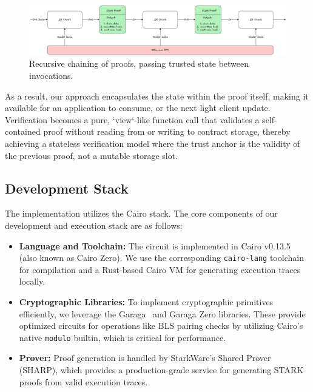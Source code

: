 \documentclass[runningheads]{llncs}
\begin{document}
\begin{figure}[H]
    \centering
    \includegraphics[width=1\textwidth]{diagrams/recursion_diagram.png}
    \caption{Recursive chaining of proofs, passing trusted state between invocations.}
    \label{fig:recursion_diagram}
\end{figure}

As a result, our approach encapsulates the state within the proof itself, making it available for an application to consume, or the next light client update. Verification becomes a pure, `view`-like function call that validates a self-contained proof without reading from or writing to contract storage, thereby achieving a stateless verification model where the trust anchor is the validity of the previous proof, not a mutable storage slot.

\subsection{Development Stack}
\label{subsection:development-stack}
The implementation utilizes the Cairo stack. The core components of our development and execution stack are as follows:

\begin{itemize}
    \item \textbf{Language and Toolchain:} The circuit is implemented in Cairo v0.13.5 (also known as Cairo Zero). We use the corresponding \texttt{cairo-lang} toolchain for compilation and a Rust-based Cairo VM for generating execution traces locally.
    \item \textbf{Cryptographic Libraries:} To implement cryptographic primitives efficiently, we leverage the Garaga~\cite{Prime2025Garaga} and Garaga Zero libraries. These provide optimized circuits for operations like BLS pairing checks by utilizing Cairo's native \texttt{modulo} builtin, which is critical for performance.
    \item \textbf{Prover:} Proof generation is handled by StarkWare's Shared Prover (SHARP), which provides a production-grade service for generating STARK proofs from valid execution traces.
\end{itemize}
\end{document}
